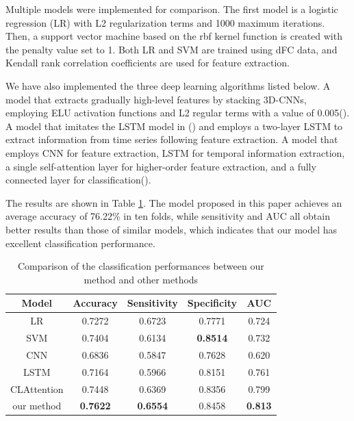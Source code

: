 \documentclass[a4paper]{cas-dc}
\begin{document}
Multiple models were implemented for comparison. The first model is a logistic regression (LR) with L2 regularization terms and 1000 maximum iterations. Then, a support vector machine based on the rbf kernel function is created with the penalty value set to 1. Both LR and SVM are trained using dFC data, and Kendall rank correlation coefficients are used for feature extraction.

We have also implemented the three deep learning algorithms listed below. A model that extracts gradually high-level features by stacking 3D-CNNs, employing ELU activation functions and L2 regular terms with a value of 0.005(\cite{deng2022diagnosing}). A model that imitates the LSTM model in (\cite{dvornek2017identifying}) and employs a two-layer LSTM to extract information from time series following feature extraction. A model that employs CNN for feature extraction, LSTM for temporal information extraction, a single self-attention layer for higher-order feature extraction, and a fully connected layer for classification(\cite{xu2021identification}).

 The results are shown in Table \ref{Table4}. The model proposed in this paper achieves an average accuracy of 76.22\% in ten folds, while sensitivity and AUC all obtain better results than those of similar models, which indicates that our model has excellent classification performance. 
\begin{table}[]
	\caption{Comparison of the classification performances between our method and other methods}\label{Table4}
	\begin{tabular*}{\tblwidth}{@{}ccccc@{}}
		\toprule
		\textbf{Model}& \textbf{Accuracy} & \textbf{Sensitivity} & \textbf{Specificity} & \textbf{AUC} \\ %
		\midrule
		LR             & 0.7272                   & 0.6723                   & 0.7771                   & 0.724                   \\
		SVM            & 0.7404                   & 0.6134                   & \textbf{0.8514}          & 0.732                   \\
		CNN         & 0.6836                   & 0.5847                   & 0.7628                   & 0.620                   \\
		LSTM           & 0.7164                   & 0.5966                   & 0.8151                   & 0.761                   \\
		CLAttention    & 0.7448                   & 0.6369                   & 0.8356                   & 0.799                   \\
		our method     & \textbf{\textbf{0.7622}} & \textbf{\textbf{0.6554}} & 0.8458                   & \textbf{\textbf{0.813}} \\
		\bottomrule
	\end{tabular*}
\end{table}
\end{document}
